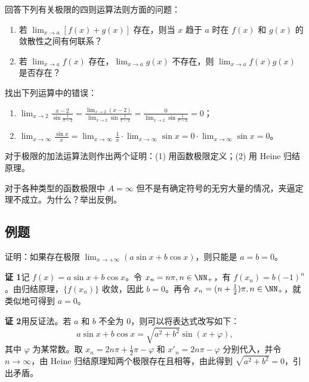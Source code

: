 \begin{xthought}[2]
回答下列有关极限的四则运算法则方面的问题：
  \begin{enumerate}
    \item 若 $\lim_{x\to a}[f(x)+g(x)]$ 存在，则当 $x$ 趋于 $a$ 时在 $f(x)$ 和 $g(x)$ 的敛散性之间有何联系？
    \item 若 $\lim_{x\to a}f(x)$ 存在，$\lim_{x\to a}g(x)$ 不存在，则 $\lim_{x\to a}f(x)g(x)$ 是否存在？
  \end{enumerate}
\end{xthought}

\begin{xthought}[3]
找出下列运算中的错误：
  \begin{enumerate}
    \item $\displaystyle\lim_{x\to2}\frac{x-2}{\sin\frac1{x-2}}
    =\frac{\lim_{x\to2}(x-2)}{\lim_{x\to2}\sin\frac1{x-2}}
    =\frac0{\lim_{x\to2}\sin\frac1{x-2}}=0$；
    \item $\displaystyle\lim_{x\to\infty}\frac{\sin x}{x}
    =\lim_{x\to\infty}\frac1x\cdot\lim_{x\to\infty}\sin x
    =0\cdot\lim_{x\to\infty}\sin x=0$。
  \end{enumerate}
\end{xthought}

\begin{xthought}[4]
对于极限的加法运算法则作出两个证明：(1) 用函数极限定义；(2) 用 Heine 归结原理。
\end{xthought}

\begin{xthought}[5]
对于各种类型的函数极限中 $A=\infty$ 但不是有确定符号的无穷大量的情况，夹逼定理不成立。为什么？举出反例。
\end{xthought}

\subsection{例题}

\begin{xexample}[4.2.2]
证明：如果存在极限 $\lim_{x\to+\infty}(a\sin x+b\cos x)$，则只能是 $a=b=0$。
\end{xexample}
\begin{xproof}
\textbf{证 1}\quad 记 $f(x)=a\sin x+b\cos x$。令 $x_n=n\pi,n\in\NN_+$，有 $f(x_n)=b(-1)^n$。由归结原理，$\{f(x_n)\}$ 收敛，因此 $b=0$。再令 $x_n=(n+\frac12)\pi,n\in\NN_+$，就类似地可得到 $a=0$。

\textbf{证 2}\quad 用反证法。若 $a$ 和 $b$ 不全为 0，则可以将表达式改写如下：
\[
  a\sin x+b\cos x=\sqrt{a^2+b^2}\sin(x+\varphi),
\]
其中 $\varphi$ 为某常数。取 $x_n=2n\pi+\frac12\pi-\varphi$ 和 $x'_n=2n\pi-\varphi$ 分别代入，并令 $n\to\infty$，由 Heine 归结原理知两个极限存在且相等，由此得到 $\sqrt{a^2+b^2}=0$，引出矛盾。
\end{xproof}


